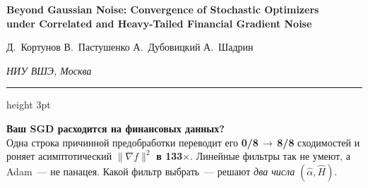 \documentclass[a0,landscape]{a0poster}
\newcommand{\norm}[1]{\lVert#1\rVert}
\begin{document}
{\color{titlered}\veryHuge\bfseries
Beyond Gaussian Noise: Convergence of Stochastic Optimizers\\
under Correlated and Heavy-Tailed Financial Gradient Noise\par}
\medskip
{\Large Д.~Кортунов \quad В.~Пастушенко \quad А.~Дубовицкий \quad А.~Шадрин\par}
\smallskip
{\Large\textit{НИУ ВШЭ, Москва}\par}
\medskip
{\color{titlered}\hrule height 3pt}
\bigskip

\setlength{\fboxsep}{0.7cm}%
\noindent\colorbox{baitbg}{%
  \parbox{\dimexpr\textwidth-1.4cm\relax}{\centering
    {\LARGE\bfseries\color{titlered}
     Ваш SGD расходится на финансовых данных?}\\[0.3em]
    {\large Одна строка причинной предобработки переводит его
     \textbf{0/8\,$\boldsymbol\to$\,8/8} сходимостей и роняет
     асимптотический $\norm{\nabla f}^2$ \textbf{в 133$\times$}.
     Линейные фильтры так не умеют, а Adam~--- не панацея.
     Какой фильтр выбрать~--- решают \emph{два числа} $(\hat\alpha,\hat H)$.}}}
\par\medskip
\setlength{\fboxsep}{3pt}%
\end{document}

